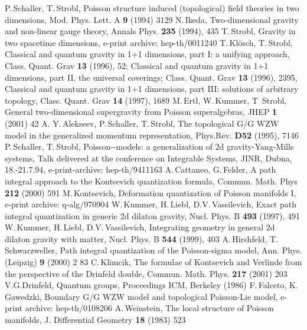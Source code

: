 \documentclass[a4paper,twoside,11pt]{article}
\numberwithin{equation}{section}
\begin{document}
\begin{thebibliography}{235}
%
%
 P.\,Schaller, T.\,Strobl, Poisson structure induced (topological) field theories in two dimensions, Mod. Phys. Lett. A {\bf 9} (1994) 3129
%
  N.\,Ikeda, Two-dimensional gravity and non-linear gauge theory, Annals Phys. {\bf 235} (1994), 435
%
 T.\,Strobl, Gravity in two spacetime dimensions, e-print archive: hep-th/0011240
%
 T.\,Kl\"osch, T.\,Strobl,  Classical and quantum gravity in 1+1 dimensions, part I: a unifying approach, Class. Quant. Grav {\bf 13} (1996), 52; 
Classical and quantum gravity in 1+1 dimensions, part II. the universal coverings; Class. Quant. Grav {\bf 13} (1996), 2395, Classical and quantum gravity in 
1+1 dimensions, part III: solutions of arbitrary topology, Class. Quant. Grav {\bf 14} (1997), 1689
%
 M.\,Ertl, W.\,Kummer, T\, Strobl, General two-dimensional supergravity from Poisson superalgebras, JHEP {\bf 1} (2001) 42
%
 A. Y.\,Alekseev, P.\,Schaller, T.\,Strobl, The topological G/G WZW model in the generalized momentum representation, Phys.Rev. {\bf D52} (1995), 7146 
%
  P.\,Schaller, T.\,Strobl, Poisson-\myHighlight{$\sigma$}\coordHE{}-models: a generalization of 2d gravity-Yang-Mills systems, Talk delivered at 
the conference on Integrable Systems, JINR, Dubna, 18.-21.7.94, e-print-archive: hep-th/9411163
 A.\,Cattaneo, G.\,Felder, A path integral approach to the Kontsevich quantization formula, Commun. Math. Phys {\bf 212} (2000) 591
%
 M.\,Kontsevich, Deformation quantization of Poisson manifolds I, e-print archive: q-alg/970904
%
 W.\,Kummer, H.\,Liebl, D.V.\,Vassilevich, Exact path integral quantization in generic 2d dilaton gravity, Nucl. Phys. B {\bf 493} (1997), 491
%
 W.\,Kummer, H.\,Liebl, D.V.\,Vassilevich, Integrating geometry in general 2d dilaton gravity with matter,  Nucl. Phys. B {\bf 544} (1999), 403
%
 A.\,Hirshfeld, T.\,Schwarzweller, Path integral quantization of the Poisson-sigma model, Ann. Phys. (Leipzig) {\bf 9} (2000) 2 83
%
 C.\,Klimcik, The formulae of Kontsevich and Verlinde from the perspective of the Drinfeld double, Commun. Math. Phys. {\bf 217} (2001) 203
%
 V.G.\;Drinfeld, Quantum groups, Proceedings ICM, Berkeley (1986)
%
 F.\,Falceto, K.\,Gawedzki,  Boundary G/G WZW model and topological Poisson-Lie model, e-print archive:  hep-th/0108206
%
 A.\,Weinstein,  The local structure of Poisson manifolds, J. Differential Geometry {\bf 18} (1983) 523 

\end{thebibliography}
\end{document}

